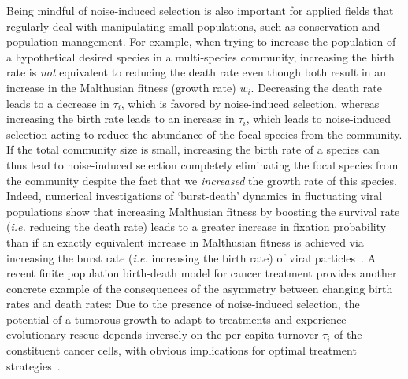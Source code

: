 Being mindful of noise-induced selection is also important for applied fields that regularly deal with manipulating small populations, such as conservation and population management. For example, when trying to increase the population of a hypothetical desired species in a multi-species community, increasing the birth rate is \emph{not} equivalent to reducing the death rate even though both result in an increase in the Malthusian fitness (growth rate) $w_i$. Decreasing the death rate leads to a decrease in $\tau_i$, which is favored by noise-induced selection, whereas increasing the birth rate leads to an increase in $\tau_i$, which leads to noise-induced selection acting to reduce the abundance of the focal species from the community. If the total community size is small, increasing the birth rate of a species can thus lead to noise-induced selection completely eliminating the focal species from the community despite the fact that we \emph{increased} the growth rate of this species. Indeed, numerical investigations of `burst-death' dynamics in fluctuating viral populations show that increasing Malthusian fitness by boosting the survival rate (\emph{i.e.} reducing the death rate) leads to a greater increase in fixation probability than if an exactly equivalent increase in Malthusian fitness is achieved via increasing the burst rate (\emph{i.e.} increasing the birth rate) of viral particles~\citep{alexander_fixation_2008}.  A recent finite population birth-death model for cancer treatment provides another concrete example of the consequences of the asymmetry between changing birth rates and death rates: Due to the presence of noise-induced selection, the potential of a tumorous growth to adapt to treatments and experience evolutionary rescue depends inversely on the per-capita turnover $\tau_i$ of the constituent cancer cells, with obvious implications for optimal treatment strategies~\citep{raatz_promoting_2023}.


